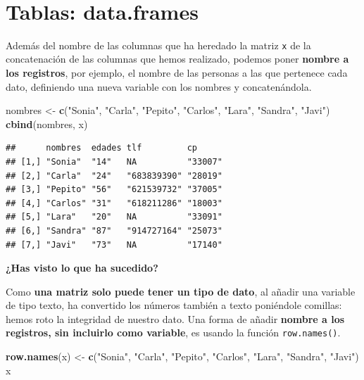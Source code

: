 \documentclass[11pt,]{book}
\newenvironment{Shaded}{\begin{snugshade}}{\end{snugshade}}
\newcommand{\KeywordTok}[1]{\textcolor[rgb]{0.27,0.27,0.27}{\textbf{#1}}}
\newcommand{\NormalTok}[1]{#1}
\newcommand{\StringTok}[1]{\textcolor[rgb]{0.5,0.5,0.5}{#1}}
\begin{document}
~

\hypertarget{tablas-data.frames}{%
\section{Tablas: data.frames}\label{tablas-data.frames}}

Además del nombre de las columnas que ha heredado la matriz \texttt{x} de la concatenación de las columnas que hemos realizado, podemos poner \textbf{nombre a los registros}, por ejemplo, el nombre de las personas a las que pertenece cada dato, definiendo una nueva variable con los nombres y concatenándola.

\begin{Shaded}
\begin{Highlighting}[]
\NormalTok{nombres <-}\StringTok{ }\KeywordTok{c}\NormalTok{(}\StringTok{"Sonia"}\NormalTok{, }\StringTok{"Carla"}\NormalTok{, }\StringTok{"Pepito"}\NormalTok{, }\StringTok{"Carlos"}\NormalTok{, }\StringTok{"Lara"}\NormalTok{, }\StringTok{"Sandra"}\NormalTok{, }\StringTok{"Javi"}\NormalTok{)}
\KeywordTok{cbind}\NormalTok{(nombres, x)}
\end{Highlighting}
\end{Shaded}

\begin{verbatim}
##      nombres  edades tlf         cp     
## [1,] "Sonia"  "14"   NA          "33007"
## [2,] "Carla"  "24"   "683839390" "28019"
## [3,] "Pepito" "56"   "621539732" "37005"
## [4,] "Carlos" "31"   "618211286" "18003"
## [5,] "Lara"   "20"   NA          "33091"
## [6,] "Sandra" "87"   "914727164" "25073"
## [7,] "Javi"   "73"   NA          "17140"
\end{verbatim}

\textbf{¿Has visto lo que ha sucedido?}

Como \textbf{una matriz solo puede tener un tipo de dato}, al añadir una variable de tipo texto, ha convertido los números también a texto poniéndole comillas: hemos roto la integridad de nuestro dato. Una forma de añadir \textbf{nombre a los registros, sin incluirlo como variable}, es usando la función \texttt{row.names()}.

\begin{Shaded}
\begin{Highlighting}[]
\KeywordTok{row.names}\NormalTok{(x) <-}\StringTok{ }\KeywordTok{c}\NormalTok{(}\StringTok{"Sonia"}\NormalTok{, }\StringTok{"Carla"}\NormalTok{, }\StringTok{"Pepito"}\NormalTok{, }\StringTok{"Carlos"}\NormalTok{, }\StringTok{"Lara"}\NormalTok{, }\StringTok{"Sandra"}\NormalTok{, }\StringTok{"Javi"}\NormalTok{)}
\NormalTok{x}
\end{Highlighting}
\end{Shaded}
\end{document}
